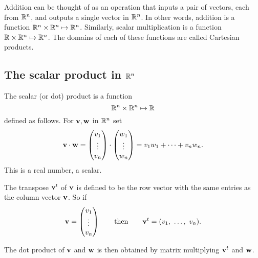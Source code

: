 \documentclass[10pt, a4paper]{article}
\begin{document}
Addition can be thought of as an operation that inputs a pair of vectors, each from $\mathbb{R} ^ n$, and outputs a single vector in $\mathbb{R} ^ n$. In other words, addition is a function $\mathbb{R} ^ n \times \mathbb{R} ^ n \mapsto \mathbb{R} ^ n$. Similarly, scalar multiplication is a function $\mathbb{R} \times \mathbb{R} ^ n \mapsto \mathbb{R} ^ n$. The domains of each of these functions are called Cartesian products.

\subsection{The scalar product in \texorpdfstring{$\mathbb{R} ^ n$}{}}

\begin{definition}
    The scalar (or dot) product is a function
    \[
    \mathbb{R} ^ n \times \mathbb{R} ^ n \mapsto \mathbb{R}
    \]
    defined as follows. For $\mathbf{v, w}$ in $\mathbb{R} ^ n$ set
    \[
    \mathbf{v \cdot w} =
    \begin{pmatrix}
        v_1 \\
        \vdots \\
        v_n
    \end{pmatrix}
    \cdot
    \begin{pmatrix}
        w_1 \\
        \vdots \\
        w_n
    \end{pmatrix}
    =
    v_1 w_1 + \cdots + v_n w_n.
    \]
    This is a real number, a scalar.
\end{definition}

The transpose $\mathbf{v} ^ t$ of $\mathbf{v}$ is defined to be the row vector with the same entries as the column vector $\mathbf{v}$. So if
\[
\mathbf{v} = \begin{pmatrix}
    v_1 \\
    \vdots \\
    v_n
\end{pmatrix}
\qquad\text{then}
\qquad\mathbf{v} ^ t = (v_1,\ \dots,\ v_n).
\]

The dot product of $\mathbf{v}$ and $\mathbf{w}$ is then obtained by matrix multiplying $\mathbf{v} ^ t$ and $\mathbf{w}$.
\end{document}
